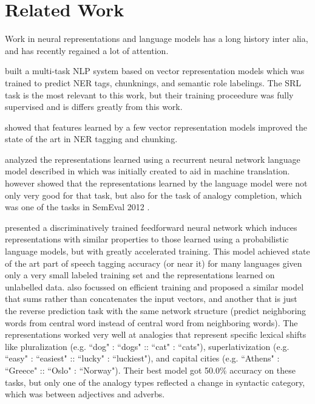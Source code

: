 \documentclass[11pt,letterpaper]{article}
\begin{document}
\section{Related Work} %
Work in neural representations and language models has a long history
\cite{foundation1,foundation2,foundation3} inter alia,
and has recently regained a lot of attention.


\cite{DBLP:conf/icml/CollobertW08} built a multi-task NLP system based
on vector representation models which was trained to predict NER tags,
chunknings, and semantic role labelings. The SRL task is the most relevant
to this work, but their training proceedure was fully supervised and
is differs greatly from this work.

\cite{turian} showed that features learned by
a few vector representation models improved the state of the art in NER tagging and chunking.


\cite{MikolovYZ13} analyzed the representations learned using
	a recurrent neural network language model described in \cite{DBLP:conf/interspeech/KombrinkMKB11}
which was initially created to aid in machine translation.
\cite{MikolovYZ13} however showed that the representations learned by the
language model were not only very good for that task, but also for the
task of analogy completion, which was one of the tasks in SemEval 2012 \cite{semeval2012}.

\cite{rami} presented a discriminatively trained feedforward neural network
which induces representations with similar properties to those learned using
a probabilistic language models, but with greatly accelerated training.
This model achieved state of the art part of speech tagging accuracy (or near it)
for many languages given only a very small labeled training set and the representations
learned on unlabelled data.
\cite{DBLP:journals/corr/abs-1301-3781} also focussed on efficient training and
proposed a similar model that sums rather than concatenates the input vectors,
and another that is just the reverse prediction task with the same network structure
(predict neighboring words from central word instead of central word from neighboring words).
The representations worked very well at analogies that represent specific lexical shifts
like pluralization (e.g. ``dog" : ``dogs" :: ``cat" : ``cats"), superlativization
(e.g. ``easy" : ``easiest" :: ``lucky" : ``luckiest"), and
capital cities (e.g. ``Athens" : ``Greece" :: ``Oslo" : ``Norway").
Their best model got 50.0\% accuracy on these tasks, but only one of the analogy types
reflected a change in syntactic category, which was between adjectives and adverbs.
\end{document}
